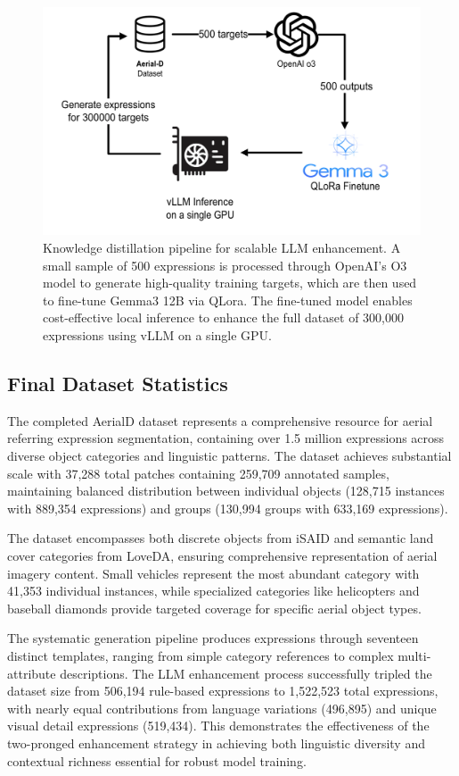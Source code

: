 \begin{figure}[H]
\centering
\includegraphics[width=\columnwidth]{./images/distillation.png}
\caption{Knowledge distillation pipeline for scalable LLM enhancement. A small sample of 500 expressions is processed through OpenAI's O3 model to generate high-quality training targets, which are then used to fine-tune Gemma3 12B via QLora. The fine-tuned model enables cost-effective local inference to enhance the full dataset of 300,000 expressions using vLLM on a single GPU.}
\label{fig:llm_distillation}
\end{figure}

\subsection{Final Dataset Statistics}

The completed AerialD dataset represents a comprehensive resource for aerial referring expression segmentation, containing over 1.5 million expressions across diverse object categories and linguistic patterns. The dataset achieves substantial scale with 37,288 total patches containing 259,709 annotated samples, maintaining balanced distribution between individual objects (128,715 instances with 889,354 expressions) and groups (130,994 groups with 633,169 expressions).

The dataset encompasses both discrete objects from iSAID and semantic land cover categories from LoveDA, ensuring comprehensive representation of aerial imagery content. Small vehicles represent the most abundant category with 41,353 individual instances, while specialized categories like helicopters and baseball diamonds provide targeted coverage for specific aerial object types.

The systematic generation pipeline produces expressions through seventeen distinct templates, ranging from simple category references to complex multi-attribute descriptions. The LLM enhancement process successfully tripled the dataset size from 506,194 rule-based expressions to 1,522,523 total expressions, with nearly equal contributions from language variations (496,895) and unique visual detail expressions (519,434). This demonstrates the effectiveness of the two-pronged enhancement strategy in achieving both linguistic diversity and contextual richness essential for robust model training.

